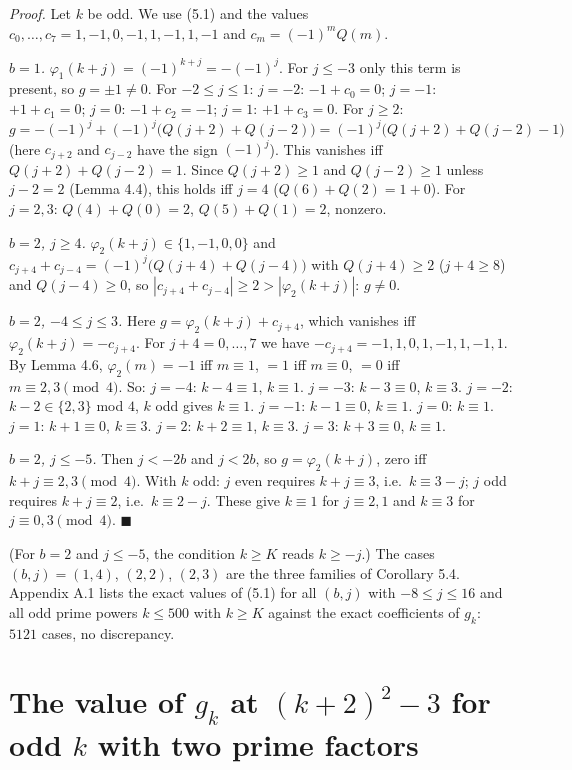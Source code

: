 \emph{Proof.} Let \(k\) be odd. We use (5.1) and the values \(c_0,\dots,c_7=1,-1,0,-1,1,-1,1,-1\) and \(c_{m}=(-1)^mQ(m)\).

\emph{\(b=1\).} \(\varphi_1(k+j)=(-1)^{k+j}=-(-1)^j\). For \(j\le-3\) only this term is present, so \(g=\pm1\ne0\). For \(-2\le j\le1\): \(j=-2\): \(-1+c_0=0\); \(j=-1\): \(+1+c_1=0\); \(j=0\): \(-1+c_2=-1\); \(j=1\): \(+1+c_3=0\). For \(j\ge2\): \(g=-(-1)^j+(-1)^j\bigl(Q(j+2)+Q(j-2)\bigr)=(-1)^j\bigl(Q(j+2)+Q(j-2)-1\bigr)\) (here \(c_{j+2}\) and \(c_{j-2}\) have the sign \((-1)^j\)). This vanishes iff \(Q(j+2)+Q(j-2)=1\). Since \(Q(j+2)\ge1\) and \(Q(j-2)\ge1\) unless \(j-2=2\) (Lemma 4.4), this holds iff \(j=4\) (\(Q(6)+Q(2)=1+0\)). For \(j=2,3\): \(Q(4)+Q(0)=2\), \(Q(5)+Q(1)=2\), nonzero.

\emph{\(b=2\), \(j\ge4\).} \(\varphi_2(k+j)\in\{1,-1,0,0\}\) and \(c_{j+4}+c_{j-4}=(-1)^j\bigl(Q(j+4)+Q(j-4)\bigr)\) with \(Q(j+4)\ge2\) (\(j+4\ge8\)) and \(Q(j-4)\ge0\), so \(|c_{j+4}+c_{j-4}|\ge2>|\varphi_2(k+j)|\): \(g\ne0\).

\emph{\(b=2\), \(-4\le j\le3\).} Here \(g=\varphi_2(k+j)+c_{j+4}\), which vanishes iff \(\varphi_2(k+j)=-c_{j+4}\). For \(j+4=0,\dots,7\) we have \(-c_{j+4}=-1,1,0,1,-1,1,-1,1\). By Lemma 4.6, \(\varphi_2(m)=-1\) iff \(m\equiv1\), \(=1\) iff \(m\equiv0\), \(=0\) iff \(m\equiv2,3\pmod4\). So: \(j=-4\): \(k-4\equiv1\), \(k\equiv1\). \(j=-3\): \(k-3\equiv0\), \(k\equiv3\). \(j=-2\): \(k-2\in\{2,3\}\) mod \(4\), \(k\) odd gives \(k\equiv1\). \(j=-1\): \(k-1\equiv0\), \(k\equiv1\). \(j=0\): \(k\equiv1\). \(j=1\): \(k+1\equiv0\), \(k\equiv3\). \(j=2\): \(k+2\equiv1\), \(k\equiv3\). \(j=3\): \(k+3\equiv0\), \(k\equiv1\).

\emph{\(b=2\), \(j\le-5\).} Then \(j<-2b\) and \(j<2b\), so \(g=\varphi_2(k+j)\), zero iff \(k+j\equiv2,3\pmod 4\). With \(k\) odd: \(j\) even requires \(k+j\equiv3\), i.e.~\(k\equiv3-j\); \(j\) odd requires \(k+j\equiv2\), i.e.~\(k\equiv2-j\). These give \(k\equiv1\) for \(j\equiv2,1\) and \(k\equiv3\) for \(j\equiv0,3\pmod4\). \(\blacksquare\)

(For \(b=2\) and \(j\le-5\), the condition \(k\ge K\) reads \(k\ge-j\).) The cases \((b,j)=(1,4)\), \((2,2)\), \((2,3)\) are the three families of Corollary 5.4. Appendix A.1 lists the exact values of (5.1) for all \((b,j)\) with \(-8\le j\le16\) and all odd prime powers \(k\le500\) with \(k\ge K\) against the exact coefficients of \(g_k\): \(5121\) cases, no discrepancy.

\section{\texorpdfstring{The value of \(g_k\) at \((k+2)^2-3\) for odd \(k\) with two prime factors}{The value of g\_k at (k+2)\^{}2-3 for odd k with two prime factors}}\label{the-value-of-g_k-at-k22-3-for-odd-k-with-two-prime-factors}

